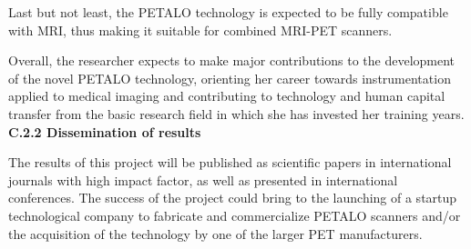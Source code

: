 Last but not least, the PETALO technology is expected to be fully compatible with MRI, thus making it suitable for combined MRI-PET scanners. 

Overall, the researcher expects to make major contributions to the development of the novel PETALO technology, orienting her career towards instrumentation applied to medical imaging and contributing to technology and human capital transfer from the basic research field in which she has invested her training years. 
\\

\noindent\textbf{C.2.2 Dissemination of results}

The results of this project will be published as scientific papers in international journals with high impact factor, as well as presented in international conferences. The success of the project could bring to the launching of a startup technological company to fabricate and commercialize PETALO scanners and/or the acquisition of the technology by one of the larger PET manufacturers. 
\\